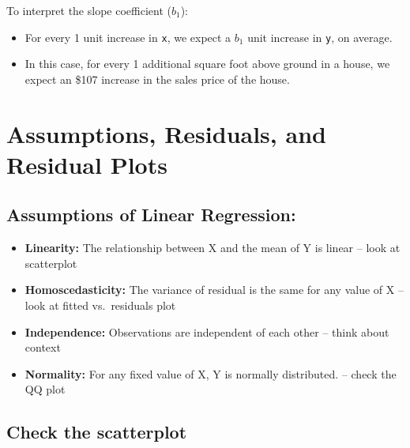 \documentclass[
  letterpaper,
  DIV=11,
  numbers=noendperiod]{scrartcl}
\providecommand{\tightlist}{%
  \setlength{\itemsep}{0pt}\setlength{\parskip}{0pt}}\usepackage{longtable,booktabs,array}
\begin{document}
To interpret the slope coefficient (\(b_1\)):

\begin{itemize}
\tightlist
\item
  For every 1 unit increase in \texttt{x}, we expect a \(b_1\) unit
  increase in \texttt{y}, on average.
\item
  In this case, for every 1 additional square foot above ground in a
  house, we expect an \$107 increase in the sales price of the house.
\end{itemize}

\hypertarget{assumptions-residuals-and-residual-plots}{%
\section{Assumptions, Residuals, and Residual
Plots}\label{assumptions-residuals-and-residual-plots}}

\hypertarget{assumptions-of-linear-regression}{%
\subsection{Assumptions of Linear
Regression:}\label{assumptions-of-linear-regression}}

\begin{itemize}
\tightlist
\item
  \textbf{Linearity:} The relationship between X and the mean of Y is
  linear -- look at scatterplot
\item
  \textbf{Homoscedasticity:} The variance of residual is the same for
  any value of X -- look at fitted vs.~residuals plot
\item
  \textbf{Independence:} Observations are independent of each other --
  think about context
\item
  \textbf{Normality:} For any fixed value of X, Y is normally
  distributed. -- check the QQ plot
\end{itemize}

\hypertarget{check-the-scatterplot}{%
\subsection{Check the scatterplot}\label{check-the-scatterplot}}
\end{document}
